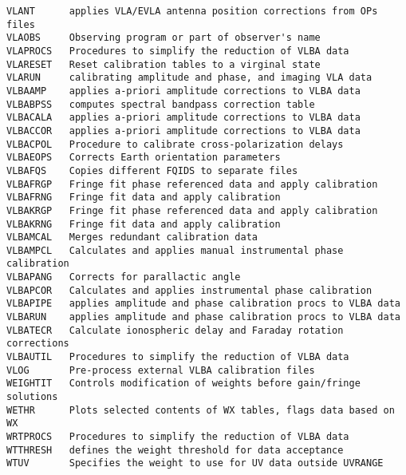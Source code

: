 \begin{verbatim}
VLANT      applies VLA/EVLA antenna position corrections from OPs files
VLAOBS     Observing program or part of observer's name
VLAPROCS   Procedures to simplify the reduction of VLBA data
VLARESET   Reset calibration tables to a virginal state
VLARUN     calibrating amplitude and phase, and imaging VLA data
VLBAAMP    applies a-priori amplitude corrections to VLBA data
VLBABPSS   computes spectral bandpass correction table
VLBACALA   applies a-priori amplitude corrections to VLBA data
VLBACCOR   applies a-priori amplitude corrections to VLBA data
VLBACPOL   Procedure to calibrate cross-polarization delays
VLBAEOPS   Corrects Earth orientation parameters
VLBAFQS    Copies different FQIDS to separate files
VLBAFRGP   Fringe fit phase referenced data and apply calibration
VLBAFRNG   Fringe fit data and apply calibration
VLBAKRGP   Fringe fit phase referenced data and apply calibration
VLBAKRNG   Fringe fit data and apply calibration
VLBAMCAL   Merges redundant calibration data
VLBAMPCL   Calculates and applies manual instrumental phase calibration
VLBAPANG   Corrects for parallactic angle
VLBAPCOR   Calculates and applies instrumental phase calibration
VLBAPIPE   applies amplitude and phase calibration procs to VLBA data
VLBARUN    applies amplitude and phase calibration procs to VLBA data
VLBATECR   Calculate ionospheric delay and Faraday rotation corrections
VLBAUTIL   Procedures to simplify the reduction of VLBA data
VLOG       Pre-process external VLBA calibration files
WEIGHTIT   Controls modification of weights before gain/fringe solutions
WETHR      Plots selected contents of WX tables, flags data based on WX
WRTPROCS   Procedures to simplify the reduction of VLBA data
WTTHRESH   defines the weight threshold for data acceptance
WTUV       Specifies the weight to use for UV data outside UVRANGE
\end{verbatim}\eve


